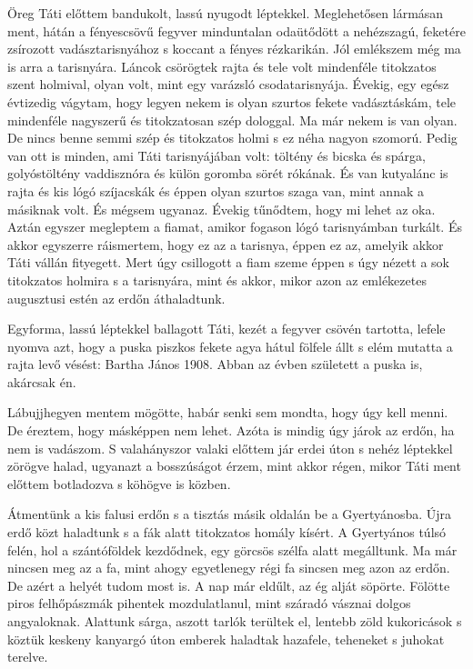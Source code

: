 \documentclass{IEEEtran}
\begin{document}
Öreg Táti előttem bandukolt, lassú nyugodt léptekkel. Meglehetősen lármásan ment, hátán a fényescsövű fegyver minduntalan odaütődött a nehézszagú, feketére zsírozott vadásztarisnyához s koccant a fényes rézkarikán. Jól emlékszem még ma is arra a tarisnyára. Láncok csörögtek rajta és tele volt mindenféle titokzatos szent holmival, olyan volt, mint egy varázsló csodatarisnyája. Évekig, egy egész évtizedig vágytam, hogy legyen nekem is olyan szurtos fekete vadásztáskám, tele mindenféle nagyszerű és titokzatosan szép dologgal. Ma már nekem is van olyan. De nincs benne semmi szép és titokzatos holmi s ez néha nagyon szomorú. Pedig van ott is minden, ami Táti tarisnyájában volt: töltény és bicska és spárga, golyóstöltény vaddisznóra és külön goromba sörét rókának. És van kutyalánc is rajta és kis lógó szíjacskák és éppen olyan szurtos szaga van, mint annak a másiknak volt. És mégsem ugyanaz. Évekig tűnődtem, hogy mi lehet az oka. Aztán egyszer megleptem a fiamat, amikor fogason lógó tarisnyámban turkált. És akkor egyszerre ráismertem, hogy ez az a tarisnya, éppen ez az, amelyik akkor Táti vállán fityegett. Mert úgy csillogott a fiam szeme éppen s úgy nézett a sok titokzatos holmira s a tarisnyára, mint és akkor, mikor azon az emlékezetes augusztusi estén az erdőn áthaladtunk.

Egyforma, lassú léptekkel ballagott Táti, kezét a fegyver csövén tartotta, lefele nyomva azt, hogy a puska piszkos fekete agya hátul fölfele állt s elém mutatta a rajta levő vésést: Bartha János 1908. Abban az évben született a puska is, akárcsak én.

Lábujjhegyen mentem mögötte, habár senki sem mondta, hogy úgy kell menni. De éreztem, hogy másképpen nem lehet. Azóta is mindig úgy járok az erdőn, ha nem is vadászom. S valahányszor valaki előttem jár erdei úton s nehéz léptekkel zörögve halad, ugyanazt a bosszúságot érzem, mint akkor régen, mikor Táti ment előttem botladozva s köhögve is közben.

Átmentünk a kis falusi erdőn s a tisztás másik oldalán be a Gyertyánosba. Újra erdő közt haladtunk s a fák alatt titokzatos homály kísért. A Gyertyános túlsó felén, hol a szántóföldek kezdődnek, egy görcsös szélfa alatt megálltunk. Ma már nincsen meg az a fa, mint ahogy egyetlenegy régi fa sincsen meg azon az erdőn. De azért a helyét tudom most is. A nap már eldűlt, az ég alját söpörte. Fölötte piros felhőpászmák pihentek mozdulatlanul, mint száradó vásznai dolgos angyaloknak. Alattunk sárga, aszott tarlók terültek el, lentebb zöld kukoricások s köztük keskeny kanyargó úton emberek haladtak hazafele, teheneket s juhokat terelve.
\end{document}
